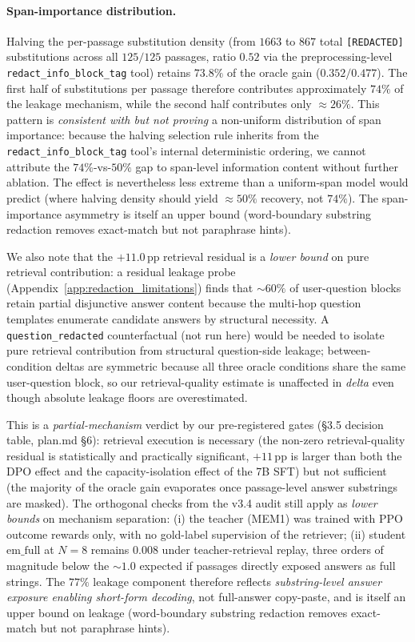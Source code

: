 \paragraph{Span-importance distribution.}
Halving the per-passage substitution density (from $1663$ to $867$ total \texttt{[REDACTED]} substitutions across all $125/125$ passages, ratio $0.52$ via the preprocessing-level \texttt{redact\_info\_block\_tag} tool) retains $73.8\%$ of the oracle gain ($0.352 / 0.477$). The first half of substitutions per passage therefore contributes approximately $74\%$ of the leakage mechanism, while the second half contributes only $\approx 26\%$. This pattern is \emph{consistent with but not proving} a non-uniform distribution of span importance: because the halving selection rule inherits from the \texttt{redact\_info\_block\_tag} tool's internal deterministic ordering, we cannot attribute the $74\%$-vs-$50\%$ gap to span-level information content without further ablation. The effect is nevertheless less extreme than a uniform-span model would predict (where halving density should yield $\approx 50\%$ recovery, not $74\%$). The span-importance asymmetry is itself an upper bound (word-boundary substring redaction removes exact-match but not paraphrase hints).

We also note that the $+11.0$\,pp retrieval residual is a \emph{lower bound} on pure retrieval contribution: a residual leakage probe (Appendix~\ref{app:redaction_limitations}) finds that $\sim\!60\%$ of user-question blocks retain partial disjunctive answer content because the multi-hop question templates enumerate candidate answers by structural necessity. A \texttt{question\_redacted} counterfactual (not run here) would be needed to isolate pure retrieval contribution from structural question-side leakage; between-condition deltas are symmetric because all three oracle conditions share the same user-question block, so our retrieval-quality estimate is unaffected in \emph{delta} even though absolute leakage floors are overestimated.

This is a \emph{partial-mechanism} verdict by our pre-registered gates (\S3.5 decision table, plan.md \S6): retrieval execution is necessary (the non-zero retrieval-quality residual is statistically and practically significant, $+11$\,pp is larger than both the DPO effect and the capacity-isolation effect of the 7B SFT) but not sufficient (the majority of the oracle gain evaporates once passage-level answer substrings are masked). The orthogonal checks from the v3.4 audit still apply as \emph{lower bounds} on mechanism separation: (i) the teacher (MEM1) was trained with PPO outcome rewards only, with no gold-label supervision of the retriever; (ii) student $\mathrm{em\_full}$ at $N{=}8$ remains $0.008$ under teacher-retrieval replay, three orders of magnitude below the ${\sim}1.0$ expected if passages directly exposed answers as full strings. The $77\%$ leakage component therefore reflects \emph{substring-level answer exposure enabling short-form decoding}, not full-answer copy-paste, and is itself an upper bound on leakage (word-boundary substring redaction removes exact-match but not paraphrase hints).

